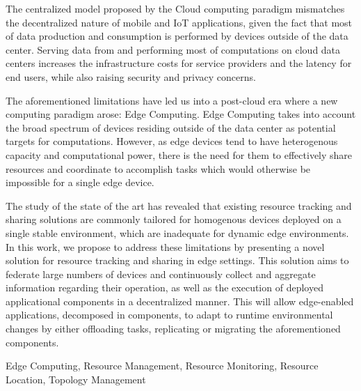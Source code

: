 

The centralized model proposed by the Cloud computing paradigm mismatches the decentralized nature of mobile and IoT applications, given the fact that most of data production and consumption is performed by devices outside of the data center. Serving data from and performing most of computations on cloud data centers increases the infrastructure costs for service providers and the latency for end users, while also raising security and privacy concerns. 

The aforementioned limitations have led us into a post-cloud era where a new computing paradigm arose: Edge Computing. Edge Computing takes into account the broad spectrum of devices residing outside of the data center as potential targets for computations. However, as edge devices tend to have heterogenous capacity and computational power, there is the need for them to effectively share resources and coordinate to accomplish tasks which would otherwise be impossible for a single edge device. 

The study of the state of the art has revealed that existing resource tracking and sharing solutions are commonly tailored for homogenous devices deployed on a single stable environment, which are inadequate for dynamic edge environments. In this work, we propose to address these limitations by presenting a novel solution for resource tracking and sharing in edge settings. This solution aims to federate large numbers of devices and continuously collect and aggregate information regarding their operation, as well as the
execution of deployed applicational components in a decentralized manner. This will allow edge-enabled applications, decomposed in components, to adapt to runtime environmental changes by either offloading tasks, replicating or migrating the aforementioned components.


\begin{keywords}

    Edge Computing, Resource Management, Resource Monitoring, Resource Location, Topology Management
    
\end{keywords}
